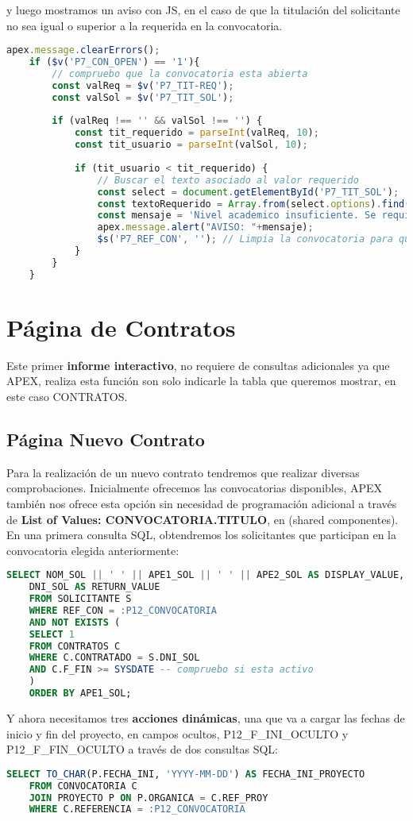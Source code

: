 y luego mostramos un aviso con \acrshort{JS}, en el caso de que la titulación del solicitante no sea igual o superior a la requerida en la convocatoria.
\begin{lstlisting}[language=JavaScript, caption={Control y aviso de titulación insuficiente}]
	apex.message.clearErrors();
	if ($v('P7_CON_OPEN') == '1'){
		// compruebo que la convocatoria esta abierta
		const valReq = $v('P7_TIT-REQ');
		const valSol = $v('P7_TIT_SOL');
		
		if (valReq !== '' && valSol !== '') {
			const tit_requerido = parseInt(valReq, 10);
			const tit_usuario = parseInt(valSol, 10);
			
			if (tit_usuario < tit_requerido) {
				// Buscar el texto asociado al valor requerido
				const select = document.getElementById('P7_TIT_SOL');
				const textoRequerido = Array.from(select.options).find(opt => opt.value === valReq)?.text || 'nivel superior';
				const mensaje = 'Nivel academico insuficiente. Se requiere al menos: ' + textoRequerido;
				apex.message.alert("AVISO: "+mensaje);
				$s('P7_REF_CON', ''); // Limpia la convocatoria para que elijan otra
			}
		} 
	}
\end{lstlisting}

\section{Página de Contratos}
Este primer \textbf{informe interactivo}, no requiere de consultas adicionales ya que \acrshort{APEX}, realiza esta función son solo indicarle la tabla que queremos mostrar, en este caso CONTRATOS.
\subsection{Página Nuevo Contrato}
Para la realización de un nuevo contrato tendremos que realizar diversas comprobaciones. Inicialmente ofrecemos las convocatorias disponibles, \acrshort{APEX} también nos ofrece esta opción sin necesidad de programación adicional a través de \textbf{List of Values: CONVOCATORIA.TITULO}, en  (shared componentes).
En una primera consulta \acrshort{SQL}, obtendremos los solicitantes que participan en la convocatoria elegida anteriormente:
\begin{lstlisting}[language=SQL, caption={Comprueba campo de titulación requerida}]
	SELECT NOM_SOL || ' ' || APE1_SOL || ' ' || APE2_SOL AS DISPLAY_VALUE,
	DNI_SOL AS RETURN_VALUE
	FROM SOLICITANTE S
	WHERE REF_CON = :P12_CONVOCATORIA
	AND NOT EXISTS (
	SELECT 1
	FROM CONTRATOS C
	WHERE C.CONTRATADO = S.DNI_SOL
	AND C.F_FIN >= SYSDATE -- compruebo si esta activo
	)
	ORDER BY APE1_SOL;
\end{lstlisting}
Y ahora necesitamos tres \textbf{acciones dinámicas}, una que va a cargar las fechas de inicio y fin del proyecto, en campos ocultos, P12\_F\_INI\_OCULTO y P12\_F\_FIN\_OCULTO  a través de dos consultas \acrshort{SQL}:
\begin{lstlisting}[language=SQL, caption={Carga fecha inicio proyecto}]
	SELECT TO_CHAR(P.FECHA_INI, 'YYYY-MM-DD') AS FECHA_INI_PROYECTO
	FROM CONVOCATORIA C 
	JOIN PROYECTO P ON P.ORGANICA = C.REF_PROY
	WHERE C.REFERENCIA = :P12_CONVOCATORIA
\end{lstlisting}


